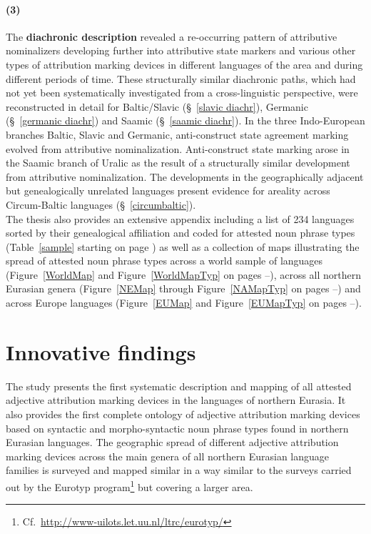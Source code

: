 \paragraph{(3)}
The \textbf{diachronic description} revealed a re-occurring pattern of attributive nominalizers developing further into attributive state markers and various other types of attribution marking devices in different languages of the area and during different periods of time. These structurally similar diachronic paths, which had not yet been systematically investigated from a cross-linguistic perspective, were reconstructed in detail for Baltic\slash{}Slavic (\S~\ref{slavic diachr}), Germanic (\S~\ref{germanic diachr}) and Saamic (\S~\ref{saamic diachr}). In the three Indo-European branches Baltic, Slavic and Germanic, anti-construct state agreement marking evolved from attributive nominalization. Anti-construct state marking arose in the Saamic branch of Uralic as the result of a structurally similar development from attributive nominalization. The developments in the geographically adjacent but genealogically unrelated languages present evidence for areality across Circum-Baltic languages (\S~\ref{circumbaltic}).\\

\noindent The thesis also provides an extensive appendix including a list of 234 languages sorted by their genealogical affiliation and coded for attested noun phrase types (Table~\ref{sample} starting on page \pageref{sample}) as well as a collection of maps illustrating the spread of attested noun phrase types across a world sample of languages (Figure~\ref{WorldMap} and Figure~\ref{WorldMapTyp} on pages \pageref{WorldMap}–\pageref{WorldMapTyp}), across all northern Eurasian genera (Figure~\ref{NEMap} through Figure~\ref{NAMapTyp} on pages \pageref{NEMap}–\pageref{NAMapTyp}) and across Europe languages (Figure~\ref{EUMap} and Figure~\ref{EUMapTyp} on pages \pageref{EUMap}–\pageref{EUMapTyp}).

\section{Innovative findings}
The study presents the first systematic description and mapping of all attested adjective attribution marking devices in the languages of northern Eurasia. It also provides the first complete ontology of adjective attribution marking devices based on syntactic and morpho-syntactic noun phrase types found in northern Eurasian languages. The geographic spread of different adjective attribution marking devices across the main genera of all northern Eurasian language families is surveyed and mapped similar in a way similar to the surveys carried out by the Eurotyp program\footnote{Cf.~\url{http://www-uilots.let.uu.nl/ltrc/eurotyp/}} but covering a larger area. %

